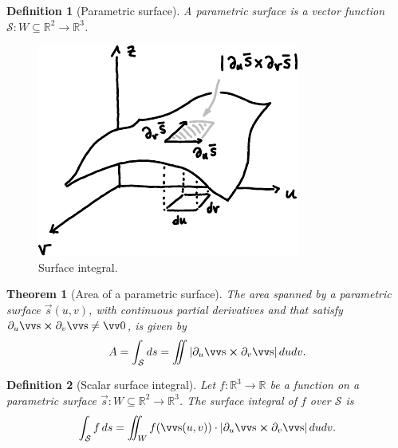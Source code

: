 \documentclass[twocolumn, margin=small]{tex/hsrzf}
\theoremstyle{fuvarzf}
\newtheorem{theorem}{Theorem}
\newtheorem{definition}{Definition}
\begin{document}
\begin{definition}[Parametric surface]
  A parametric surface is a vector function \(\mathcal{S}: W \subseteq \mathbb{R}^2 \to
  \mathbb{R}^3\).
\end{definition}

\begin{figure}
  \centering
  \includegraphics{img/surface-integral}
  \caption{
    Surface integral.
  }
\end{figure}

\begin{theorem}[Area of a parametric surface]
  The area spanned by a parametric surface \(\vec{s}(u,v)\), with continuous
  partial derivatives and that satisfy \(\partial_u \vec{s} \crossp \partial_v
  \vec{s} \neq \vec{0}\), is given by
  \[
    A = \int_\mathcal{S} ds 
      = \iint |\partial_u \vec{s} \crossp \partial_v \vec{s}| \,dudv .
  \]
\end{theorem}

\begin{definition}[Scalar surface integral]
  Let \(f: \mathbb{R}^3 \to \mathbb{R}\) be a function on a parametric surface
  \(\vec{s}: W \subseteq \mathbb{R}^2 \to \mathbb{R}^3\).  The surface integral
  of \(f\) over \(\mathcal{S}\) is
  \[
    \int_\mathcal{S} f \,ds = 
      \iint_W f(\vec{s}(u,v)) \cdot 
        |\partial_u \vec{s} \crossp \partial_v \vec{s}| \,dudv .
  \]
\end{definition}
\end{document}
